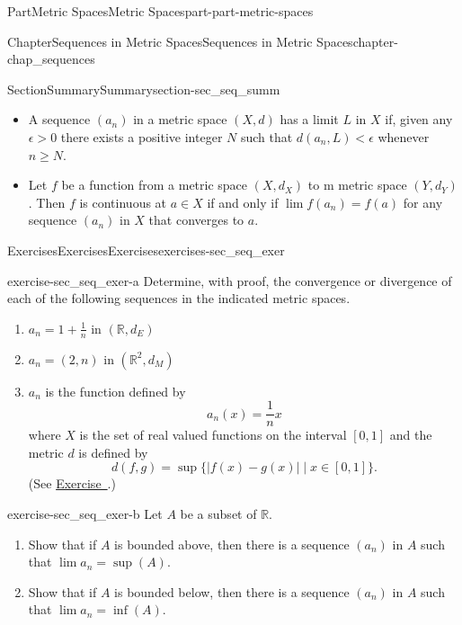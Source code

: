 \documentclass[oneside,10pt,]{book}
\newcommand{\xreffont}{\relax}
\numberwithin{equation}{chapter}
\newcommand{\R}{\mathbb{R}}
\newcommand{\lt}{<}
\newcommand{\gt}{>}
\begin{document}
\begin{partptx}{Part}{Metric Spaces}{}{Metric Spaces}{}{}{part-part-metric-spaces}
\begin{chapterptx}{Chapter}{Sequences in Metric Spaces}{}{Sequences in Metric Spaces}{}{}{chapter-chap_sequences}
\begin{sectionptx}{Section}{Summary}{}{Summary}{}{}{section-sec_seq_summ}
\begin{itemize}[label=\textbullet]
\item{}A sequence \((a_n)\) in a metric space \((X,d)\) has a limit \(L\) in \(X\) if, given any \(\epsilon \gt 0\) there exists a positive integer \(N\) such that \(d(a_n,L) \lt \epsilon\) whenever \(n \geq N\).%
\item{}Let \(f\) be a function from a metric space \((X,d_X)\) to m metric space \((Y,d_Y)\). Then \(f\) is continuous at \(a \in X\) if and only if \(\lim f(a_n) = f(a)\) for any sequence \((a_n)\) in \(X\) that converges to \(a\).%
\end{itemize}
%
\end{sectionptx}
%
%
\typeout{************************************************}
\typeout{************************************************}
%
\begin{exercises-section}{Exercises}{Exercises}{}{Exercises}{}{}{exercises-sec_seq_exer}
\begin{divisionexercise}{1}{}{}{exercise-sec_seq_exer-a}%
Determine, with proof, the convergence or divergence of each of the following sequences in the indicated metric spaces.%
\begin{enumerate}[font=\bfseries,label=(\alph*),ref=\alph*]%
\item{}\(a_n = 1+\frac{1}{n}\) in \((\R, d_E)\)%
\item{}\(a_n = (2,n)\) in \((\R^2, d_M)\)%
\item{}\(a_n\) is the function defined by%
\begin{equation*}
a_n(x) = \frac{1}{n}x
\end{equation*}
where \(X\) is the set of real valued functions on the interval \([0,1]\) and the metric \(d\) is defined by%
\begin{equation*}
d(f,g) = \sup\{|f(x)-g(x)| \mid x \in [0,1]\}\text{.}
\end{equation*}
(See \hyperlink{exercise-ex_GLB_function_sup_metric}{Exercise~{\xreffont 4}}.)%
\end{enumerate}%
\end{divisionexercise}%
\begin{divisionexercise}{2}{}{}{exercise-sec_seq_exer-b}%
Let \(A\) be a subset of \(\R\).%
\begin{enumerate}[font=\bfseries,label=(\alph*),ref=\alph*]%
\item{}Show that if \(A\) is bounded above, then there is a sequence \((a_n)\) in \(A\) such that \(\lim a_n = \sup(A)\).%
\item{}Show that if \(A\) is bounded below, then there is a sequence \((a_n)\) in \(A\) such that \(\lim a_n = \inf(A)\).%

\end{enumerate}
\end{divisionexercise}
\end{exercises-section}
\end{chapterptx}
\end{partptx}
\end{document}
